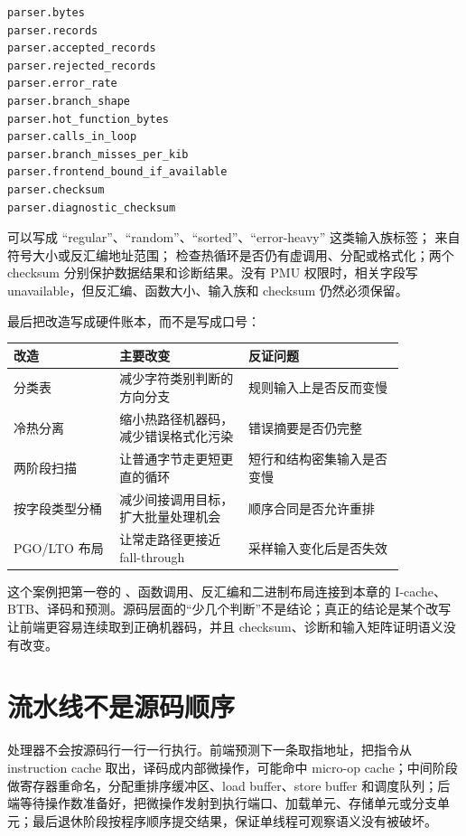\begin{lstlisting}[numbers=none,caption={解析器前端报告字段}]
parser.bytes
parser.records
parser.accepted_records
parser.rejected_records
parser.error_rate
parser.branch_shape
parser.hot_function_bytes
parser.calls_in_loop
parser.branch_misses_per_kib
parser.frontend_bound_if_available
parser.checksum
parser.diagnostic_checksum
\end{lstlisting}

 可以写成 ``regular''、``random''、``sorted''、``error-heavy'' 这类输入族标签； 来自符号大小或反汇编地址范围； 检查热循环是否仍有虚调用、分配或格式化；两个 checksum 分别保护数据结果和诊断结果。没有 PMU 权限时，相关字段写 unavailable，但反汇编、函数大小、输入族和 checksum 仍然必须保留。

最后把改造写成硬件账本，而不是写成口号：

\begin{center}
\small
\begin{tabular}{@{}p{0.23\linewidth}p{0.29\linewidth}p{0.34\linewidth}@{}}
\toprule
改造 & 主要改变 & 反证问题 \\
\midrule
分类表 & 减少字符类别判断的方向分支 & 规则输入上是否反而变慢 \\
冷热分离 & 缩小热路径机器码，减少错误格式化污染 & 错误摘要是否仍完整 \\
两阶段扫描 & 让普通字节走更短更直的循环 & 短行和结构密集输入是否变慢 \\
按字段类型分桶 & 减少间接调用目标，扩大批量处理机会 & 顺序合同是否允许重排 \\
PGO/LTO 布局 & 让常走路径更接近 fall-through & 采样输入变化后是否失效 \\
\bottomrule
\end{tabular}
\end{center}

这个案例把第一卷的 、函数调用、反汇编和二进制布局连接到本章的 I-cache、BTB、译码和预测。源码层面的“少几个判断”不是结论；真正的结论是某个改写让前端更容易连续取到正确机器码，并且 checksum、诊断和输入矩阵证明语义没有改变。

\section{流水线不是源码顺序}

处理器不会按源码行一行一行执行。前端预测下一条取指地址，把指令从 instruction cache 取出，译码成内部微操作，可能命中 micro-op cache；中间阶段做寄存器重命名，分配重排序缓冲区、load buffer、store buffer 和调度队列；后端等待操作数准备好，把微操作发射到执行端口、加载单元、存储单元或分支单元；最后退休阶段按程序顺序提交结果，保证单线程可观察语义没有被破坏。

